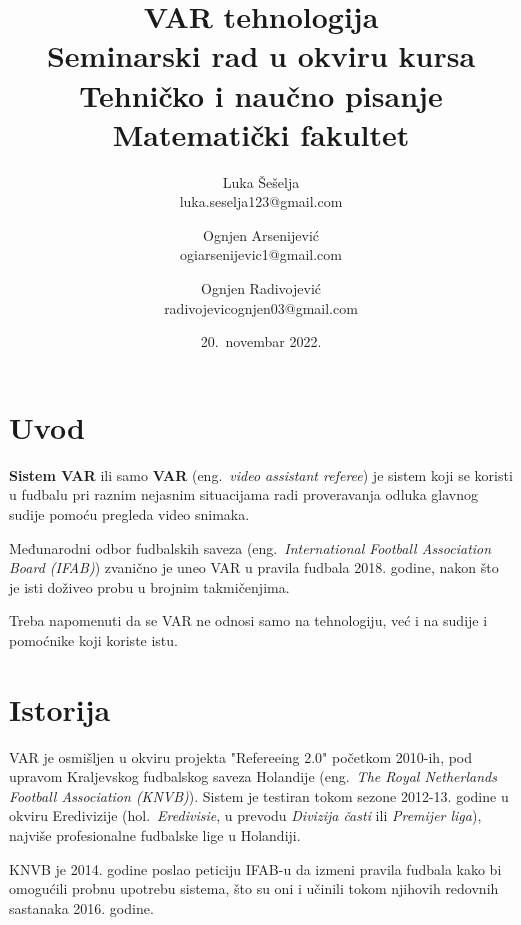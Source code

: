 \documentclass[a4paper]{article}
\begin{document}
\title{VAR tehnologija\\ \small{Seminarski rad u okviru kursa\\Tehničko i naučno pisanje\\ Matematički fakultet}}

\author{Luka Šešelja\\ luka.seselja123@gmail.com \and Ognjen Arsenijević\\ ogiarsenijevic1@gmail.com \and Ognjen Radivojević\\ radivojevicognjen03@gmail.com}
\date{20.~novembar 2022.}
\maketitle

\begin{abstract}
    
\end{abstract}

\tableofcontents

\newpage

\section{Uvod}
\textbf{Sistem VAR} ili samo \textbf{VAR} (eng.~{\em video assistant referee}) je sistem koji se koristi u fudbalu pri raznim nejasnim situacijama radi proveravanja odluka glavnog sudije pomoću pregleda video snimaka.

Međunarodni odbor fudbalskih saveza (eng.~{\em International Football Association Board (IFAB)}) zvanično je uneo VAR u pravila fudbala 2018. godine, nakon što je isti doživeo probu u brojnim takmičenjima.

Treba napomenuti da se VAR ne odnosi samo na tehnologiju, već i na sudije i pomoćnike koji koriste istu.

\section{Istorija}
VAR je osmišljen u okviru projekta "Refereeing 2.0" početkom 2010-ih, pod upravom Kraljevskog fudbalskog saveza Holandije (eng.~{\em The Royal Netherlands Football Association (KNVB)}). Sistem je testiran tokom sezone 2012-13. godine u okviru Eredivizije (hol.~{\emph{Eredivisie}, u prevodu \emph{Divizija časti} ili \emph{Premijer liga}}), najviše profesionalne fudbalske lige u Holandiji. 

KNVB je 2014. godine poslao peticiju IFAB-u da izmeni pravila fudbala kako bi omogućili probnu upotrebu sistema, što su oni i učinili tokom njihovih redovnih sastanaka 2016. godine.
\end{document}

